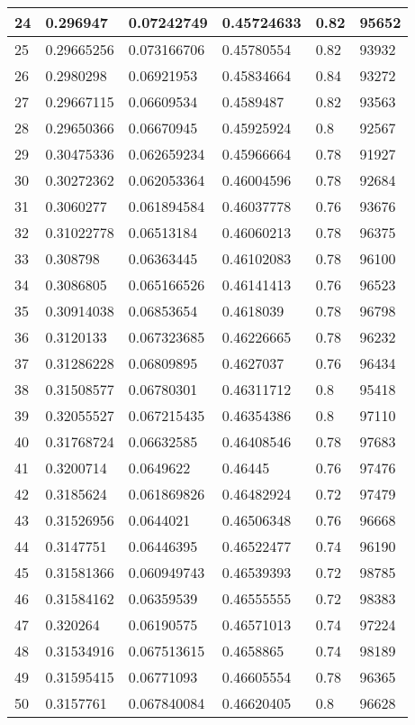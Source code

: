 \begin{longtable}{|l|l|l|l|l|l|}
24 & 0.296947 & 0.07242749 & 0.45724633 & 0.82 & 95652 \\ \hline 
25 & 0.29665256 & 0.073166706 & 0.45780554 & 0.82 & 93932 \\ \hline 
26 & 0.2980298 & 0.06921953 & 0.45834664 & 0.84 & 93272 \\ \hline 
27 & 0.29667115 & 0.06609534 & 0.4589487 & 0.82 & 93563 \\ \hline 
28 & 0.29650366 & 0.06670945 & 0.45925924 & 0.8 & 92567 \\ \hline 
29 & 0.30475336 & 0.062659234 & 0.45966664 & 0.78 & 91927 \\ \hline 
30 & 0.30272362 & 0.062053364 & 0.46004596 & 0.78 & 92684 \\ \hline 
31 & 0.3060277 & 0.061894584 & 0.46037778 & 0.76 & 93676 \\ \hline 
32 & 0.31022778 & 0.06513184 & 0.46060213 & 0.78 & 96375 \\ \hline 
33 & 0.308798 & 0.06363445 & 0.46102083 & 0.78 & 96100 \\ \hline 
34 & 0.3086805 & 0.065166526 & 0.46141413 & 0.76 & 96523 \\ \hline 
35 & 0.30914038 & 0.06853654 & 0.4618039 & 0.78 & 96798 \\ \hline 
36 & 0.3120133 & 0.067323685 & 0.46226665 & 0.78 & 96232 \\ \hline 
37 & 0.31286228 & 0.06809895 & 0.4627037 & 0.76 & 96434 \\ \hline 
38 & 0.31508577 & 0.06780301 & 0.46311712 & 0.8 & 95418 \\ \hline 
39 & 0.32055527 & 0.067215435 & 0.46354386 & 0.8 & 97110 \\ \hline 
40 & 0.31768724 & 0.06632585 & 0.46408546 & 0.78 & 97683 \\ \hline 
41 & 0.3200714 & 0.0649622 & 0.46445 & 0.76 & 97476 \\ \hline 
42 & 0.3185624 & 0.061869826 & 0.46482924 & 0.72 & 97479 \\ \hline 
43 & 0.31526956 & 0.0644021 & 0.46506348 & 0.76 & 96668 \\ \hline 
44 & 0.3147751 & 0.06446395 & 0.46522477 & 0.74 & 96190 \\ \hline 
45 & 0.31581366 & 0.060949743 & 0.46539393 & 0.72 & 98785 \\ \hline 
46 & 0.31584162 & 0.06359539 & 0.46555555 & 0.72 & 98383 \\ \hline 
47 & 0.320264 & 0.06190575 & 0.46571013 & 0.74 & 97224 \\ \hline 
48 & 0.31534916 & 0.067513615 & 0.4658865 & 0.74 & 98189 \\ \hline 
49 & 0.31595415 & 0.06771093 & 0.46605554 & 0.78 & 96365 \\ \hline 
50 & 0.3157761 & 0.067840084 & 0.46620405 & 0.8 & 96628 \\ \hline 
\end{longtable}